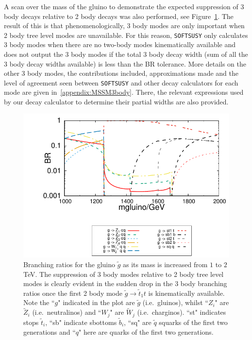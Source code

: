 \documentclass[final,3p,times]{elsarticle}
\begin{document}
A scan over the mass of the gluino to demonstrate the expected suppression of
3 body decays relative to 2 body decays was also performed, see
Figure~\ref{gluino3body}. The result of this is that phenomenologically, 3
body modes are only important when 2 body tree level modes are
unavailable. For this 
reason, {\tt SOFTSUSY} only calculates 3 body modes when there are no
two-body modes kinematically available and does not output the 3 body
modes if 
the total 3 body decay width (sum of all the 3 body decay widths
available) is less than the BR tolerance. 
More details on the other 3 body modes, the contributions included,
approximations made and the level of agreement seen between {\tt SOFTSUSY} and
other decay calculators for each mode are given in~\ref{appendix:MSSM3body}. There, the relevant expressions used by our decay
calculator to determine their partial widths are also provided. 
\begin{figure} %
\centerline{\includegraphics[width = 15.5cm]{figure4}} 
\caption{Branching ratios for the gluino $\tilde{g}$ as its mass is increased
  from $1$ to $2$ TeV. The suppression of 3 body modes relative to 2 body tree
  level modes is clearly evident in the sudden drop in the 3 body branching ratios once the first 2 body mode $\tilde{g} \rightarrow \tilde{t}_1 t$ is kinematically available. Note the ``$g$" indicated in the plot are $\tilde{g}$ (i.e.\ gluinos), whilst ``$Z_i$" are $\tilde{Z}_i$ (i.e.\ neutralinos) and ``$W_j$" are $\tilde{W}_j$ (i.e.\ charginos). ``st" indicates stops $\tilde{t}_i$, ``sb" indicate sbottoms $\tilde{b}_i$, ``sq" are $\tilde{q}$ squarks of the first two generations and ``$q$" here are quarks of the first two generations. } \label{gluino3body}
\end{figure}        
\end{document}
